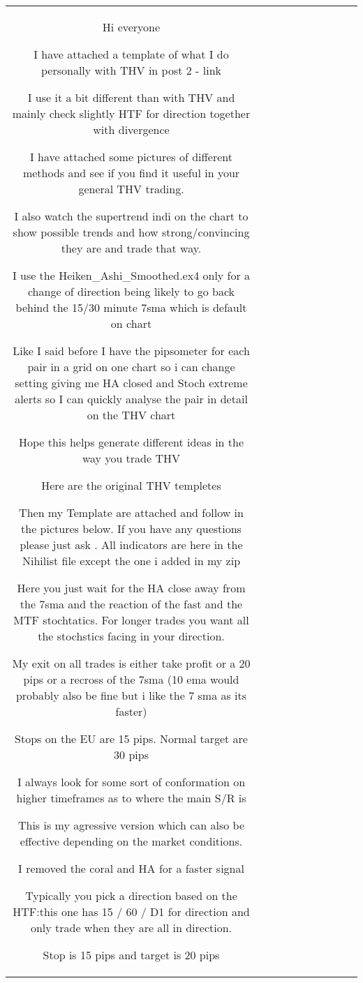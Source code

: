 \begin{table}[h!]
\begin{tabular}{|c|c|c|c|c|c|c|c|c|c|}
Hi everyone

I have attached a template of what I do personally with THV in post 2 - link

I use it a bit different than with THV and mainly check slightly HTF for direction together with divergence

I have attached some pictures of different methods and see if you find it useful in your general THV trading.

I also watch the supertrend indi on the chart to show possible trends and how strong/convincing they are and trade that way.

I use the Heiken_Ashi_Smoothed.ex4 only for a change of direction being likely to go back behind the 15/30 minute 7sma which is default on chart

Like I said before I have the pipsometer for each pair in a grid on one chart so i can change setting giving me HA closed and Stoch extreme alerts so I can quickly analyse the pair in detail on the THV chart

Hope this helps generate different ideas in the way you trade THV

Here are the original THV templetes

Then my Template are attached and follow in the pictures below.
If you have any questions please just ask . All indicators are here in the Nihilist file except the one i added in my zip


Here you just wait for the HA close away from the 7sma and the reaction of the fast and the MTF stochtatics. For longer trades you want all the stochstics facing in your direction.

My exit on all trades is either take profit or a 20 pips or a recross of the 7sma (10 ema would probably also be fine but i like the 7 sma as its faster)

Stops on the EU are 15 pips. Normal target are 30 pips

I always look for some sort of conformation on higher timeframes as to where the main S/R is


This is my agressive version which can also be effective depending on the market conditions.

I removed the coral and HA for a faster signal

Typically you pick a direction based on the HTF:this one has 15 / 60 / D1 for direction and only trade when they are all in direction.

Stop is 15 pips and target is 20 pips


\end{tabular}
\end{table}

